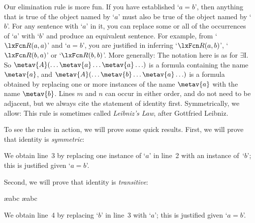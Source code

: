 Our elimination rule is more fun. If you have established `$a=b$', then anything that is true of the object named by `$a$' must also be true of the object named by `$b$'. For any sentence with `$a$' in it, you can replace some or all of the occurrences of `$a$' with `$b$' and produce an equivalent sentence. For example, from `$\atom{R}{a,a}$' and `$a = b$', you are justified in inferring `$\atom{R}{a,b}$', `$\atom{R}{b,a}$' or `$\atom{R}{b,b}$'. More generally:
The notation here is as for $\exists$I. So $\metav{A}(\ldots \metav{a} \ldots \metav{a}\ldots)$ is a formula containing the name $\metav{a}$, and $\metav{A}(\ldots \metav{b} \ldots \metav{a}\ldots)$ is a formula obtained by replacing one or more instances of the name $\metav{a}$ with the name $\metav{b}$. Lines $m$ and $n$ can occur in either order, and do not need to be adjacent, but we always cite the statement of identity first. Symmetrically, we allow:
This rule is sometimes called \emph{Leibniz's Law}, after Gottfried Leibniz.

To see the rules in action, we will prove some quick results. First, we will prove that identity is \emph{symmetric}:
\begin{fitchproof}
	\open
		\AS
	\close
\end{fitchproof}
We obtain line~3 by replacing one instance of `$a$' in line~2 with an instance of~`$b$'; this is justified given `$a= b$'.

Second, we will prove that identity is \emph{transitive}:
\begin{fitchproof}
	\open
		\AS
		\ae{abc}
		\ae{abc}
	\close
\end{fitchproof}
We obtain line~4 by replacing `$b$' in line~3 with `$a$'; this is justified given `$a= b$'.

